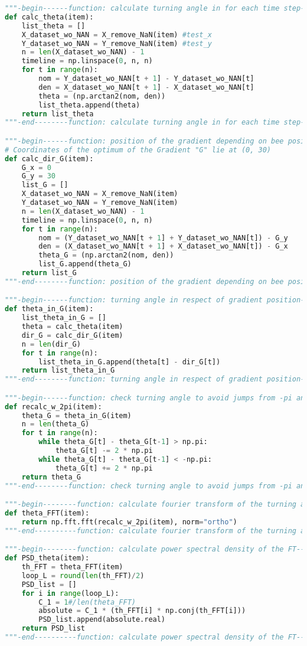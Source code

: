 \begin{lstlisting}[language=Python, basicstyle=\tiny, frame=single, keywordstyle=\color{teal}, commentstyle=\color{olive}, stringstyle=\color{red}]
"""-begin------function: calculate turning angle in for each time step-------"""
def calc_theta(item):
    list_theta = []
    X_dataset_wo_NAN = X_remove_NaN(item) #test_x
    Y_dataset_wo_NAN = Y_remove_NaN(item) #test_y
    n = len(X_dataset_wo_NAN) - 1
    timeline = np.linspace(0, n, n)
    for t in range(n):
        nom = Y_dataset_wo_NAN[t + 1] - Y_dataset_wo_NAN[t]
        den = X_dataset_wo_NAN[t + 1] - X_dataset_wo_NAN[t]
        theta = (np.arctan2(nom, den))
        list_theta.append(theta)
    return list_theta
"""-end--------function: calculate turning angle in for each time step-------"""

"""-begin------function: position of the gradient depending on bee position--"""
# Coordinates of the optimum of the Gradient "G" lie at (0, 30)
def calc_dir_G(item):
    G_x = 0
    G_y = 30
    list_G = []
    X_dataset_wo_NAN = X_remove_NaN(item)
    Y_dataset_wo_NAN = Y_remove_NaN(item)
    n = len(X_dataset_wo_NAN) - 1
    timeline = np.linspace(0, n, n)
    for t in range(n):
        nom = (Y_dataset_wo_NAN[t + 1] + Y_dataset_wo_NAN[t]) - G_y
        den = (X_dataset_wo_NAN[t + 1] + X_dataset_wo_NAN[t]) - G_x
        theta_G = (np.arctan2(nom, den))
        list_G.append(theta_G)
    return list_G
"""-end--------function: position of the gradient depending on bee position--"""

"""-begin------function: turning angle in respect of gradient position-------"""
def theta_in_G(item):
    list_theta_in_G = []
    theta = calc_theta(item)
    dir_G = calc_dir_G(item)
    n = len(dir_G)
    for t in range(n):
        list_theta_in_G.append(theta[t] - dir_G[t])
    return list_theta_in_G
"""-end--------function: turning angle in respect of gradient position-------"""

"""-begin------function: check turning angle to avoid jumps from -pi and +pi-"""
def recalc_w_2pi(item):
    theta_G = theta_in_G(item)
    n = len(theta_G)
    for t in range(n):
        while theta_G[t] - theta_G[t-1] > np.pi:
            theta_G[t] -= 2 * np.pi
        while theta_G[t] - theta_G[t-1] < -np.pi:
            theta_G[t] += 2 * np.pi
    return theta_G
"""-end--------function: check turning angle to avoid jumps from -pi and +pi-"""

"""-begin--------function: calculate fourier transform of the turning angle--"""
def theta_FFT(item):
    return np.fft.fft(recalc_w_2pi(item), norm="ortho")
"""-end----------function: calculate fourier transform of the turning angle--"""

"""-begin--------function: calculate power spectral density of the FT--------"""
def PSD_theta(item):
    th_FFT = theta_FFT(item)
    loop_L = round(len(th_FFT)/2)
    PSD_list = []
    for i in range(loop_L):
        C_1 = 1#/len(theta_FFT)
        absolute = C_1 * (th_FFT[i] * np.conj(th_FFT[i]))
        PSD_list.append(absolute.real)
    return PSD_list
"""-end----------function: calculate power spectral density of the FT--------"""


\end{lstlisting}

